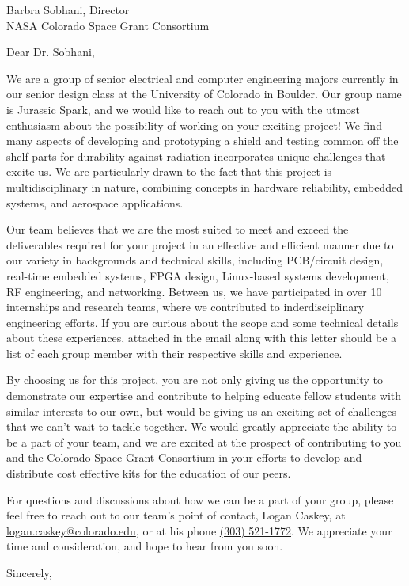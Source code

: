 \documentclass{letter}
\begin{document}
\begin{letter}
{Barbra Sobhani, Director\\
NASA Colorado Space Grant Consortium
}

\opening{Dear Dr. Sobhani,}

We are a group of senior electrical and computer engineering majors currently in our senior design class at the University of Colorado in Boulder. Our group name is Jurassic Spark, and we would like to reach out to you with the utmost enthusiasm about the possibility of working on your exciting project! We find many aspects of developing and prototyping a shield and testing common off the shelf parts for durability against radiation incorporates unique challenges that excite us. We are particularly drawn to the fact that this project is multidisciplinary in nature, combining concepts in hardware reliability, embedded systems, and aerospace applications. 

Our team believes that we are the most suited to meet and exceed the deliverables required for your project in an effective and efficient manner due to our variety in backgrounds and technical skills, including PCB/circuit design, real-time embedded systems, FPGA design, Linux-based systems development, RF engineering, and networking. Between us, we have participated in over 10 internships and research teams, where we contributed to inderdisciplinary engineering efforts. If you are curious about the scope and some technical details about these experiences, attached in the email along with this letter should be a list of each group member with their respective skills and experience. 

By choosing us for this project, you are not only giving us the opportunity to demonstrate our expertise and contribute to helping educate fellow students with similar interests to our own, but would be giving us an exciting set of challenges that we can't wait to tackle together. We would greatly appreciate the ability to be a part of your team, and we are excited at the prospect of contributing to you and the Colorado Space Grant Consortium in your efforts to develop and distribute cost effective kits for the education of our peers. 

For questions and discussions about how we can be a part of your group, please feel free to reach out to our team's point of contact, Logan Caskey, at \href{mailto:logan.caskey@colorado.edu}{logan.caskey@colorado.edu}, or at his phone \href{tel:+13035211772}{(303) 521-1772}. We appreciate your time and consideration, and hope to hear from you soon.

\vspace{1em}

\closing{Sincerely,}

\end{letter}
\end{document}
